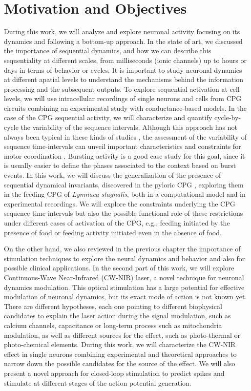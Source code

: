 \chapter{Motivation and Objectives}\label{c-review}
During this work, we will analyze and explore neuronal activity focusing on its dynamics and following a bottom-up approach. In the state of art, we discussed the importance of sequential dynamics, and how we can describe this sequentiality at different scales, from milliseconds (ionic channels) up to hours or days in terms of behavior or cycles. It is important to study neuronal dynamics at different apatial levels to understand the mechanisms behind the information processing and the subsequent outputs. To explore sequential activation at cell levels, we will use intracellular recordings of single neurons and cells from CPG circuits combining an experimental study with conductance-based models. In the case of the CPG sequential activity, we will characterize and quantify cycle-by-cycle the variability of the sequence intervals. Although this approach has not always been typical in these kinds of studies \parencite{anwar_interanimal_2022}, the assessment of the variability of sequence time-intervals can unveil important characteristics and constraints for motor coordination \parencite{elices_robust_2019}. Bursting activity is a good case study for this goal, since it is usually easier to define the phases associated to the context based on burst events. In this work, we will discuss the generalization of the presence of sequential dynamical invariants, discovered in the pyloric CPG \parencite{elices_robust_2019}, exploring them in the feeding CPG of \textit{Lymnaea stagnalis}, both in a computational model and in experimental recordings. We will explore the constraints underlying the CPG sequence time intervals but also the possible functional role of these restrictions under different cases of activation of the CPG, e.g., feeding initiated by the presence of food or feeding activity initiated even in the absence of food. 

On the other hand, we also reviewed in the previous chapter the importance of stimulation techniques to explore the neural dynamics and behavior and also for possible clinical applications. In the second part of this work, we will explore Continuous-Wave Near-Infrared (CW-NIR) laser, a novel technique for neuronal dynamics modulation. This optical stimulation has a 
 large potential for effective modulation of neuronal dynamics, but its exact mode of action is not known yet. There are different hypotheses, each one pointing to different biophysical candidates to explain the laser action  during the signal modulation, such as calcium channels, capacitance or long-term process such as mitochondria modulation, as well as different sources for the effect, such as photo-thermal or photo-chemical elements. During this work, we will characterize the CW-NIR effect in single neurons combining experimental and theoretical approaches to narrow down the possible candidates for the source of the effect. We will also present a novel approach for closed-loop stimulation to predict spikes and stimulate at different stages of the action potential generation. 

